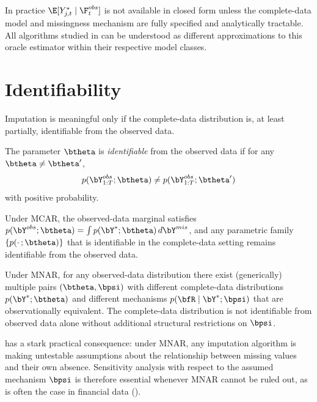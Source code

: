 \begin{remark}
In practice $\E[Y_{j,t}^*\mid\F_t^{obs}]$ is not available in closed form
unless the complete-data model and missingness mechanism are fully specified
and analytically tractable.  All algorithms studied in  can
be understood as different approximations to this oracle estimator within
their respective model classes.
\end{remark}

\section{Identifiability}
\label{sec:identifiability}

Imputation is meaningful only if the complete-data distribution is, at least
partially, identifiable from the observed data.

\begin{definition}[Identifiability]
\label{def:identifiability}
The parameter $\btheta$ is \emph{identifiable} from the observed data if for
any $\btheta\ne\btheta'$,
\[
  p(\bY_{1:T}^{obs};\btheta) \ne p(\bY_{1:T}^{obs};\btheta')
\]
with positive probability.
\end{definition}

\begin{proposition}
\label{prop:id_mcar}
Under MCAR, the observed-data marginal satisfies
$p(\bY^{obs};\btheta)=\int p(\bY^*;\btheta)\,d\bY^{mis}$, and any
parametric family $\{p(\cdot\,;\btheta)\}$ that is identifiable in the
complete-data setting remains identifiable from the observed data.
\end{proposition}

\begin{proposition}
\label{prop:nonid_mnar}
Under MNAR, for any observed-data distribution there exist (generically)
multiple pairs $(\btheta,\bpsi)$ with different complete-data distributions
$p(\bY^*;\btheta)$ and different mechanisms $p(\bfR\mid\bY^*;\bpsi)$ that
are observationally equivalent.  The complete-data distribution is not
identifiable from observed data alone without additional structural
restrictions on $\bpsi$.
\end{proposition}

\begin{remark}
 has a stark practical consequence: under MNAR, any
imputation algorithm is making untestable assumptions about the relationship
between missing values and their own absence.  Sensitivity analysis with
respect to the assumed mechanism $\bpsi$ is therefore essential whenever
MNAR cannot be ruled out, as is often the case in financial data
().
\end{remark}


